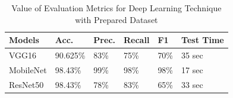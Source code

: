 \begin{table}[h]
\centering
\caption{Value of Evaluation Metrics for Deep Learning Technique with Prepared Dataset}
\captionsetup[table]{skip=10pt}


{
\begin{tabular}{llllll}
\hline
Models & Acc.   & Prec.  & Recall & F1 & Test Time   \\ \hline
VGG16        & 90.625\%  & 83\% & 75\%  & 70\% & 35 sec\\
MobileNet          & 98.43\% & 99\% & 98\%  & 98\% & 17 sec\\
ResNet50       & 98.43\% & 78\% & 83\% & 65\% & 33 sec\\
 \hline
\end{tabular}
}
\label{table:deep-raw}
\end{table}